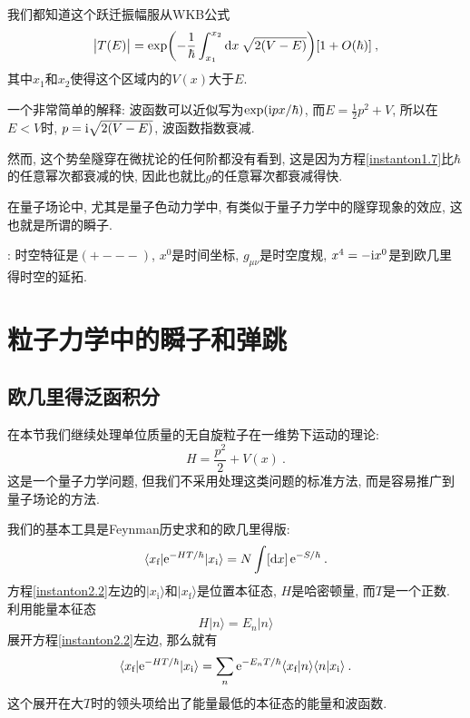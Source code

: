 我们都知道这个跃迁振幅服从WKB公式
\begin{equation}
    \bigl\lvert T(E)\bigr\rvert =\exp\biggl(-\frac{1}{\hbar}\int_{x_{1}}^{x_{2}}\mathrm{d} x\: \sqrt{2(V-E)}\biggr)[1+O(\hbar)] \:, \label{instanton1.7}
\end{equation}
其中$x_{1}$和$x_{2}$使得这个区域内的$V(x)$大于$E$. 
\begin{tcolorbox}
    一个非常简单的解释: 波函数可以近似写为$\exp(\mathrm{i} p x/\hbar)$, 而$E=\frac{1}{2}p^{2}+V$, 所以在$E<V$时, $p=\mathrm{i}\sqrt{2(V-E)}$, 波函数指数衰减.
\end{tcolorbox}
然而, 这个势垒隧穿在微扰论的任何阶都没有看到, 这是因为方程\eqref{instanton1.7}比$\hbar$的任意幂次都衰减的快, 因此也就比$g$的任意幂次都衰减得快.

在量子场论中, 尤其是量子色动力学中, 有类似于量子力学中的隧穿现象的效应, 这也就是所谓的瞬子.

{}: 时空特征是$({+}{-}{-}{-})$, $x^{0}$是时间坐标, $g_{\mu\nu}$是时空度规, $x^{4}=-\mathrm{i} x^{0}$是到欧几里得时空的延拓.

\section{粒子力学中的瞬子和弹跳} \label{instanton:sec2}

\subsection{欧几里得泛函积分} \label{instanton:sec2.1}

在本节我们继续处理单位质量的无自旋粒子在一维势下运动的理论:
\begin{equation}
    H = \frac{p^2}{2} + V(x) \:. \label{instanton2.1}
\end{equation}
这是一个量子力学问题, 但我们不采用处理这类问题的标准方法, 而是容易推广到量子场论的方法.

我们的基本工具是Feynman历史求和的欧几里得版:
\begin{equation}
    \langle x_{\text{f}} \vert \mathrm{e}^{-HT/\hbar} \vert x_{\text{i}}\rangle =N \int [\mathrm{d} x]\, \mathrm{e}^{-S/\hbar} \:. \label{instanton2.2}
\end{equation}
方程\eqref{instanton2.2}左边的$\lvert x_{\text{i}}\rangle$和$\lvert x_{\text{f}}\rangle$是位置本征态, $H$是哈密顿量, 而$T$是一个正数. 利用能量本征态
\begin{equation}
    H\vert n \rangle = E_{n} \vert n\rangle \label{instanton2.3}
\end{equation}
展开方程\eqref{instanton2.2}左边, 那么就有
\begin{equation}
    \langle x_{\text{f}} \vert \mathrm{e}^{-HT/\hbar} \vert x_{\text{i}}\rangle 
    = \sum_{n}\mathrm{e}^{-E_{n}T/\hbar}  \langle x_{\text{f}} \vert n\rangle \langle n \vert x_{\text{i}}\rangle  \:. \label{instanton2.4}
\end{equation}
这个展开在大$T$时的领头项给出了能量最低的本征态的能量和波函数.

